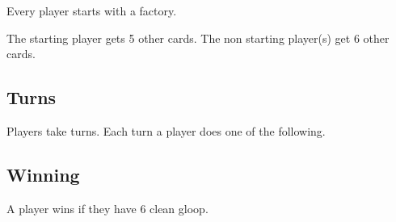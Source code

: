 \documentclass[12pt, letterpaper]{article}
\begin{document}
Every player starts with a factory.

The starting player gets 5 other cards.
The non starting player(s) get 6 other cards.

\subsection{Turns}

Players take turns. Each turn a player does one of the following.

\subsection{Winning}

A player wins if they have 6 clean gloop.

\end{document}
